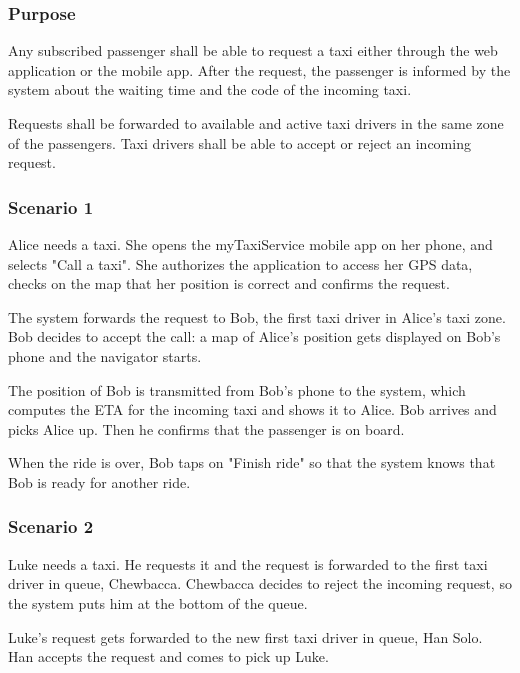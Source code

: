 \label{standard-call}
\subsubsection{Purpose}

Any subscribed passenger shall be able to request a taxi either through the web application or the mobile app.
After the request, the passenger is informed by the system about the waiting time and the code of the incoming taxi.

Requests shall be forwarded to available and active taxi drivers in the same zone of the passengers. Taxi drivers shall be able to accept or reject an incoming request.

\subsubsection{Scenario 1}
Alice needs a taxi. She opens the myTaxiService mobile app on her phone, and selects "Call a taxi". She authorizes the application to access her GPS data, checks on the map that her position is correct and confirms the request.

The system forwards the request to Bob, the first taxi driver in Alice's taxi zone. Bob decides to accept the call: a map of Alice's position gets displayed on Bob's phone and the navigator starts.

The position of Bob is transmitted from Bob's phone to the system, which computes the ETA for the incoming taxi and shows it to Alice. Bob arrives and picks Alice up. Then he confirms that the passenger is on board.

When the ride is over, Bob taps on "Finish ride" so that the system knows that Bob is ready for another ride.

\subsubsection{Scenario 2}
Luke needs a taxi. He requests it and the request is forwarded to the first taxi driver in queue, Chewbacca. Chewbacca decides to reject the incoming request, so the system puts him at the bottom of the queue.

Luke's request gets forwarded to the new first taxi driver in queue, Han Solo. Han accepts the request and comes to pick up Luke.

